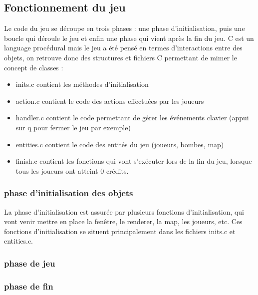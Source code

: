 \documentclass[12pt, openany]{article}
\begin{document}
	\subsection{Fonctionnement du jeu}
	Le code du jeu se découpe en trois phases : une phase d'initialisation, puis une boucle qui déroule le jeu et enfin une phase qui vient après la fin du jeu. C est un language procédural mais le jeu a été pensé en termes d'interactions entre des objets, on retrouve donc des structures et fichiers C permettant de mimer le concept de classes :\\
	\begin{itemize}[label=$-$]
		\item inits.c contient les méthodes d'initialisation\\
		\item action.c contient le code des actions effectuées par les joueurs\\
		\item handler.c contient le code permettant de gérer les événements clavier (appui sur q pour fermer le jeu par exemple)\\
		\item entities.c contient le code des entités du jeu (joueurs, bombes, map)\\
		\item finish.c contient les fonctions qui vont s'exécuter lors de la fin du jeu, lorsque tous les joueurs ont atteint 0 crédits.\\
	\end{itemize}
	
	\subsubsection{phase d'initialisation des objets}
	La phase d'initialisation est assurée par plusieurs fonctions d'initialisation, qui vont venir mettre en place la fenêtre, le renderer, la map, les joueurs, etc. Ces fonctions d'initialisation se situent principalement dans les fichiers inits.c et entities.c.\\
	
	\subsubsection{phase de jeu}
	
	\subsubsection{phase de fin}
	
\end{document}
